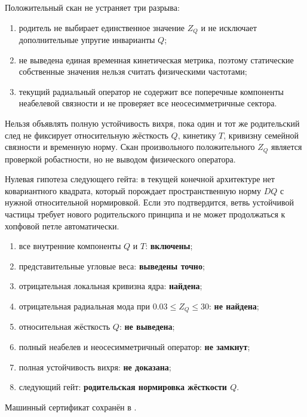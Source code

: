 Положительный скан не устраняет три разрыва:
\begin{enumerate}
 \item родитель не выбирает единственное значение $Z_Q$ и не исключает
 дополнительные упругие инварианты $Q$;
 \item не выведена единая временная кинетическая метрика, поэтому
 статические собственные значения нельзя считать физическими частотами;
 \item текущий радиальный оператор не содержит все поперечные компоненты
 неабелевой связности и не проверяет все неосесимметричные сектора.
\end{enumerate}

\begin{nogocriterion}
Нельзя объявлять полную устойчивость вихря, пока один и тот же родительский
след не фиксирует относительную жёсткость $Q$, кинетику $T$, кривизну
семейной связности и временную норму. Скан произвольного положительного
$Z_Q$ является проверкой робастности, но не выводом физического оператора.
\end{nogocriterion}

Нулевая гипотеза следующего гейта: в текущей конечной архитектуре нет
ковариантного квадрата, который порождает пространственную норму $DQ$ с
нужной относительной нормировкой. Если это подтвердится, ветвь устойчивой
частицы требует нового родительского принципа и не может продолжаться к
хопфовой петле автоматически.

\begin{protocol}
\begin{enumerate}
 \item все внутренние компоненты $Q$ и $T$: \textbf{включены};
 \item представительные угловые веса: \textbf{выведены точно};
 \item отрицательная локальная кривизна ядра: \textbf{найдена};
 \item отрицательная радиальная мода при $0.03\le Z_Q\le30$:
 \textbf{не найдена};
 \item относительная жёсткость $Q$: \textbf{не выведена};
 \item полный неабелев и неосесимметричный оператор: \textbf{не замкнут};
 \item полная устойчивость вихря: \textbf{не доказана};
 \item следующий гейт: \textbf{родительская нормировка жёсткости $Q$}.
\end{enumerate}
\end{protocol}

Машинный сертификат сохранён в
.